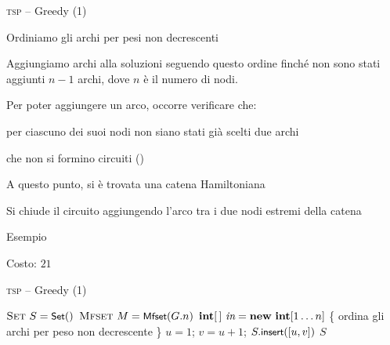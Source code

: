 \begin{frame}{\textsc{tsp} -- Greedy (1)}

\BIL
\item Ordiniamo gli archi per pesi non decrescenti
\item Aggiungiamo archi alla soluzioni seguendo questo ordine finché non 
  sono stati aggiunti $n-1$ archi, dove $n$ è il numero di nodi.
\item Per poter aggiungere un arco, occorre verificare che:
  \BI
  \item per ciascuno dei suoi nodi non siano stati già scelti due archi
  \item che non si formino circuiti (\mfset)
  \EI
\item A questo punto, si è trovata una catena Hamiltoniana
\item Si chiude il circuito aggiungendo l'arco tra i due nodi estremi della catena
\EIL

\end{frame}


\begin{frame}{Esempio}


\alert{
\bigskip
{}Costo: $21$
}


\end{frame}

\begin{frame}[shrink=10]{\textsc{tsp} -- Greedy (1)}

\vspace{-12pt}
\begin{Procedure}
\caption[A]{\Set\ \greedyTsp(\Graph $G$)}
$\textsc{Set}\ S = \textsf{{\small Set}}()$\;
$\textsc{Mfset}\ M = \textsf{{\small Mfset}}(G.n)$\;
$\INTEGER[\,]\ \Inc = \NEW\ \INTEGER[1 \ldots n]$\;
\{ ordina gli archi per peso non decrescente \}\;
\INTEGER $u = 1$;
\INTEGER $v = u+1$; 
$S.\textsf{{\small insert}}([u,v])$\;
\Return $S$\;
\end{Procedure}

\end{frame}


